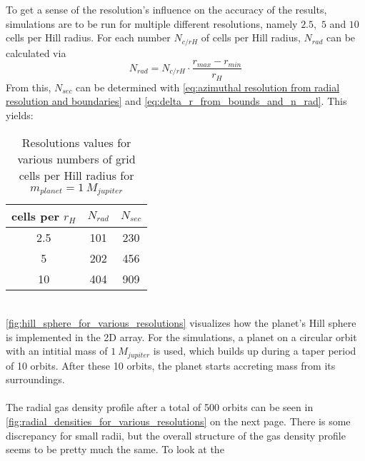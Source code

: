     \clearpage \noindent
    To get a sense of the resolution's influence on the accuracy of the 
    results, simulations are to be run 
    for multiple different resolutions, namely $2.5,$ $5$ and $10$ cells 
    per Hill radius. For each number $N_{c/rH}$ of cells per Hill radius, 
    $N_{rad}$ can be calculated via 
    \begin{equation}
      N_{rad}=N_{c/rH}\cdot\frac{r_{max}-r_{min}}{r_H}
    \end{equation}
    From this, $N_{sec}$ can be determined with 
    \autoref{eq:azimuthal resolution from radial resolution and boundaries}
    and \autoref{eq:delta_r_from_bounds_and_n_rad}. This yields:
    \begin{table}[h!]
      \begin{center}
        \caption{
          Resolutions values for various numbers of 
          grid cells per Hill radius for $m_{planet}=1\ M_{jupiter}$
        }
        \begin{tabular}{c c c}
          cells per $r_H$ & $N_{rad}$ & $N_{sec}$	\\
          \hline 
          2.5 & 101 & 230 \\
          5 & 202 & 456 \\
          10 & 404 & 909 \\
        \end{tabular}
      \end{center}
    \end{table} \ \\
    \autoref{fig:hill_sphere_for_various_resolutions} visualizes how the 
    planet's Hill sphere is implemented in the 2D array. For the simulations,
    a planet on a circular orbit with an intitial mass of $1\ M_{jupiter}$ 
    is used, which builds up during a 
    taper period of 10 orbits. After these 10 orbits, the planet starts
    accreting mass from its surroundings. \\
    \\
    The radial gas density profile after a total of 500 orbits can be seen in 
    \autoref{fig:radial_densities_for_various_resolutions} on the next page.
    There is some 
    discrepancy for small radii, but the overall structure of the gas 
    density profile seems to be pretty much the same. To look at the 
